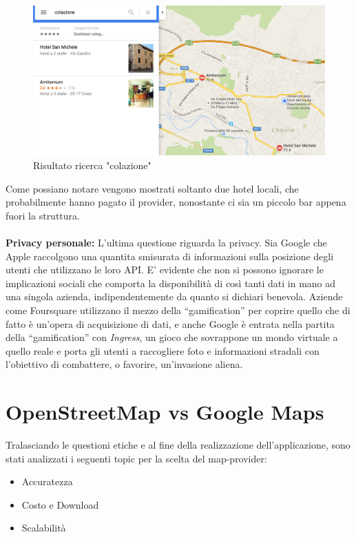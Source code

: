 \begin{figure}[H]
	\centering
	\includegraphics[scale=0.4]{OpenStreetMap/colazione.png}
	\caption{Risultato ricerca "colazione"}
	\label{fig:Ricerca_colazione}
\end{figure}

Come possiano notare vengono mostrati soltanto due hotel locali, che probabilmente hanno pagato il provider, nonostante ci sia un piccolo bar appena fuori la struttura.\\\\
\textbf{Privacy personale:} L'ultima questione riguarda la privacy. Sia Google che Apple raccolgono una quantita smisurata di informazioni sulla posizione degli utenti che utilizzano le loro API. E’ evidente che non si possono ignorare le implicazioni sociali che comporta la disponibilità di così tanti dati in mano ad una singola azienda, indipendentemente da quanto si dichiari benevola.  Aziende come Foursquare utilizzano il mezzo della “gamification” per coprire quello che di fatto è un’opera di acquisizione di dati, e anche Google è entrata nella partita della “gamification” con \textit{Ingress}, un gioco che sovrappone un mondo virtuale a quello reale e porta gli utenti a raccogliere foto e informazioni stradali con l’obiettivo di combattere, o favorire, un’invasione aliena.



\newpage
\section{OpenStreetMap vs Google Maps}
Tralasciando le questioni etiche e al fine della realizzazione dell'applicazione, sono stati analizzati i seguenti topic per la scelta del map-provider:
\begin{itemize}
\item Accuratezza
\item Costo e Download
\item Scalabilità\\
\end{itemize} 


